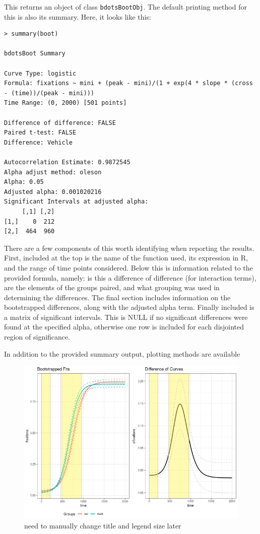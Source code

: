 \documentclass{article}
\newcommand{\xt}{\texttt}%
\begin{document}
This returns an object of class \xt{bdotsBootObj}. The default printing method for this is also its summary. Here, it looks like this:

\begin{singlespace}
\begin{verbatim}
> summary(boot)

bdotsBoot Summary

Curve Type: logistic 
Formula: fixations ~ mini + (peak - mini)/(1 + exp(4 * slope * (cross - (time))/(peak - mini))) 
Time Range: (0, 2000) [501 points]

Difference of difference: FALSE 
Paired t-test: FALSE 
Difference: Vehicle 

Autocorrelation Estimate: 0.9872545 
Alpha adjust method: oleson 
Alpha: 0.05
Adjusted alpha: 0.001020216 
Significant Intervals at adjusted alpha:
     [,1] [,2]
[1,]    0  212
[2,]  464  960
\end{verbatim}
\end{singlespace}

There are a few components of this worth identifying when reporting the results. First, included at the top is the name of the function used, its expression in R, and the range of time points considered. Below this is information related to the provided formula, namely: is this a difference of difference (for interaction terms), are the elements of the groups paired, and what grouping was used in determining the differences. The final section includes information on the bootstrapped differences, along with the adjusted alpha term. Finally included is a matrix of significant intervals. This is NULL if no significant differences were found at the specified alpha, otherwise one row is included for each disjointed region of significance. 

In addition to the provided summary output, plotting methods are available

\begin{figure}[h]
\centering
\includegraphics[scale=0.45]{img/car_boot_both.png}
\caption{need to manually change title and legend size later}
\end{figure}
\end{document}
